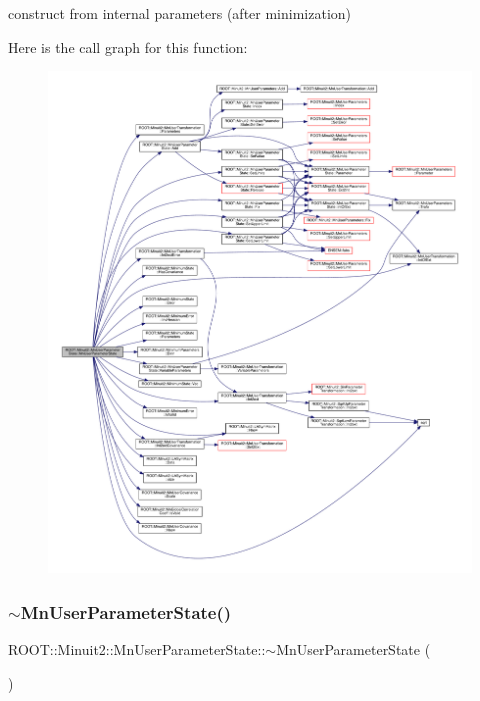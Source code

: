 construct from internal parameters (after minimization) 

Here is the call graph for this function\+:\nopagebreak
\begin{figure}[H]
\begin{center}
\leavevmode
\includegraphics[width=350pt]{d3/de0/classROOT_1_1Minuit2_1_1MnUserParameterState_a8214c3f41958849f1aaae4865bb5b129_cgraph}
\end{center}
\end{figure}
\mbox{\label{classROOT_1_1Minuit2_1_1MnUserParameterState_a3a5a64a086b883f61febd02676c0d151}} 
\subsubsection{\texorpdfstring{$\sim$MnUserParameterState()}{~MnUserParameterState()}\hspace{0.1cm}{\footnotesize\ttfamily [1/2]}}
{\footnotesize\ttfamily R\+O\+O\+T\+::\+Minuit2\+::\+Mn\+User\+Parameter\+State\+::$\sim$\+Mn\+User\+Parameter\+State (\begin{DoxyParamCaption}{ }\end{DoxyParamCaption})\hspace{0.3cm}{\ttfamily [inline]}}

